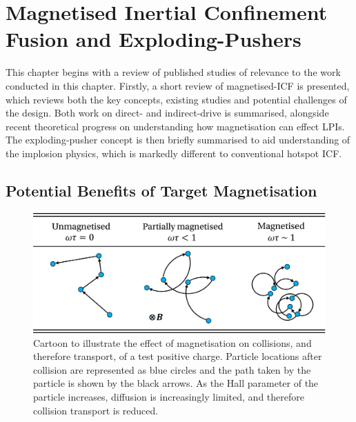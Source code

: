 \newpage

\section{Magnetised Inertial Confinement Fusion and Exploding-Pushers}%
\label{sec:Res2_MagICF}

This chapter begins with a review of published studies of relevance to the work conducted in this chapter.
Firstly, a short review of magnetised-\ac{ICF} is presented, which reviews both the key concepts, existing studies and potential challenges of the design.
Both work on direct- and indirect-drive is summarised, alongside recent theoretical progress on understanding how magnetisation can effect \ac{LPIs}.
The exploding-pusher concept is then briefly summarised to aid understanding of the implosion physics, which is markedly different to conventional hotspot \ac{ICF}.

\subsection{Potential Benefits of Target Magnetisation}%
\label{sec:Res2_magbenefits}

\begin{figure}[t!]
    \includegraphics[width=0.75\linewidth]{Results2/Images/wt_collisions.png}
    \centering
    \caption{Cartoon to illustrate the effect of magnetisation on collisions, and therefore transport, of a test positive charge.
    Particle locations after collision are represented as blue circles and the path taken by the particle is shown by the black arrows.
    As the Hall parameter of the particle increases, diffusion is increasingly limited, and therefore collision transport is reduced.}%
    \label{fig:Res2_omegatau}
\end{figure}

